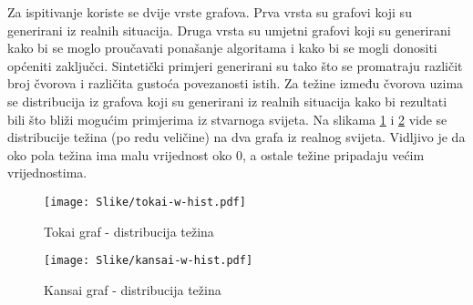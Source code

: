 \documentclass[times, utf8, diplomski, numeric]{fer}
\begin{document}
Za ispitivanje koriste se dvije vrste grafova. Prva vrsta su grafovi koji su generirani iz realnih situacija. Druga vrsta su umjetni grafovi koji su generirani kako bi se moglo proučavati ponašanje algoritama i kako bi se mogli donositi općeniti zaključci. Sintetički primjeri generirani su tako što se promatraju različit broj čvorova i različita gustoća povezanosti istih. Za težine između čvorova uzima se distribucija iz grafova koji su generirani iz realnih situacija kako bi rezultati bili što bliži mogućim primjerima iz stvarnoga svijeta. Na slikama \ref{fig:tokai-hist} i \ref{fig:kansai-hist} vide se distribucije težina (po redu veličine) na dva grafa iz realnog svijeta. Vidljivo je da oko pola težina ima malu vrijednost oko $0$, a ostale težine pripadaju većim vrijednostima.

\begin{figure}[htb]
	\texttt{[image: Slike/tokai-w-hist.pdf]}
	\caption{Tokai graf - distribucija težina}
	\label{fig:tokai-hist}
\end{figure}


\begin{figure}[htb]
	\texttt{[image: Slike/kansai-w-hist.pdf]}
	\caption{Kansai graf - distribucija težina}
	\label{fig:kansai-hist}
\end{figure}
\end{document}
